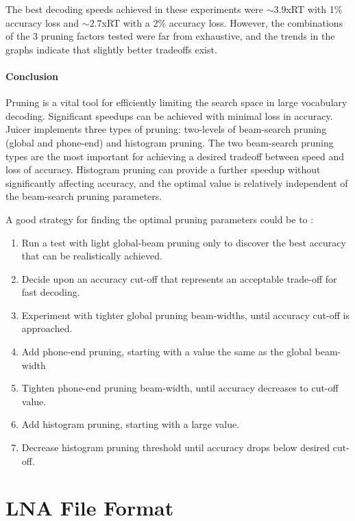 \documentclass[a4paper,12pt]{report}
\begin{document}
The best decoding speeds achieved in these experiments were $\sim3.9$xRT with 1\% accuracy loss and $\sim2.7$xRT with a 2\% accuracy loss. However, the combinations of the 3 pruning factors tested were far from exhaustive, and the trends in the graphs indicate that slightly better tradeoffs exist.

\subsubsection{Conclusion}

Pruning is a vital tool for efficiently limiting the search space in large vocabulary decoding. Significant speedups can be achieved with minimal loss in accuracy. Juicer implements three types of pruning: two-levels of beam-search pruning (global and phone-end) and histogram pruning. The two beam-search pruning types are the most important for achieving a desired tradeoff between speed and loss of accuracy. Histogram pruning can provide a further speedup without significantly affecting accuracy, and the optimal value is relatively independent of the beam-search pruning parameters.

A good strategy for finding the optimal pruning parameters could be to :

\begin{enumerate}
\item Run a test with light global-beam pruning only to discover the best accuracy that can be realistically achieved.
\item Decide upon an accuracy cut-off that represents an acceptable trade-off for fast decoding.
\item Experiment with tighter global pruning beam-widths, until accuracy cut-off is approached.
\item Add phone-end pruning, starting with a value the same as the global beam-width
\item Tighten phone-end pruning beam-width, until accuracy decreases to cut-off value.
\item Add histogram pruning, starting with a large value.
\item Decrease histogram pruning threshold until accuracy drops below desired cut-off.
\end{enumerate}


\chapter{LNA File Format}
\label{app:formats}
\end{document}
